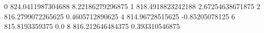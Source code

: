 0 824.0411987304688 8.22186279296875
1 818.4918823242188 2.67254638671875
2 816.2799072265625 0.4605712890625
4 814.96728515625 -0.85205078125
6 815.8193359375 0.0
8 816.212646484375 0.393310546875
